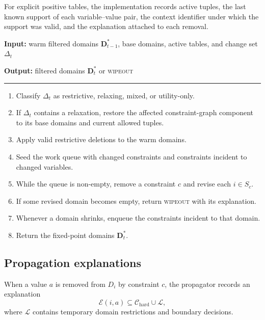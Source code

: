 \documentclass[pdflatex,sn-mathphys-num,iicol,oneside]{sn-jnl}
\newcommand{\algin}[1]{\textbf{Input:} #1\par}
\newcommand{\algout}[1]{%
  \textbf{Output:} #1\par
  \vspace{2pt}\hrule\vspace{3pt}%
}
\newenvironment{algsteps}
  {\begin{enumerate}[
      leftmargin=1.8em,
      itemsep=1pt,
      parsep=0pt,
      topsep=2pt,
      label=\arabic*:
    ]}
  {\end{enumerate}}
\begin{document}
For explicit positive tables, the implementation records active
tuples, the last known support of each variable--value pair, the
context identifier under which the support was valid, and the
explanation attached to each removal.

\begin{algorithm}[t]
\caption{Incremental GAC with restoration after relaxation}
\label{alg:incgac}
\small

\algin{
warm filtered domains $\bm{D}^{*}_{t-1}$,
base domains, active tables, and change set $\Delta_t$
}

\algout{
filtered domains $\bm{D}^{*}_{t}$ or \textsc{wipeout}
}

\begin{algsteps}

\item Classify $\Delta_t$ as restrictive, relaxing, mixed, or
utility-only.

\item If $\Delta_t$ contains a relaxation, restore the affected
constraint-graph component to its base domains and current allowed
tuples.

\item Apply valid restrictive deletions to the warm domains.

\item Seed the work queue with changed constraints and constraints
incident to changed variables.

\item While the queue is non-empty, remove a constraint $c$ and revise
each $i\in S_c$.

\item If some revised domain becomes empty, return \textsc{wipeout}
with its explanation.

\item Whenever a domain shrinks, enqueue the constraints incident to
that domain.

\item Return the fixed-point domains $\bm{D}^{*}_{t}$.

\end{algsteps}
\end{algorithm}

\subsection{Propagation explanations}
\label{sec:explanations}

When a value $a$ is removed from $D_i$ by constraint $c$, the
propagator records an explanation
\begin{equation}
\mathcal{E}(i,a)
\subseteq
\mathcal{C}_{\mathrm{hard}}
\cup
\mathcal{L},
\end{equation}
where $\mathcal{L}$ contains temporary domain restrictions and
boundary decisions.
\end{document}
